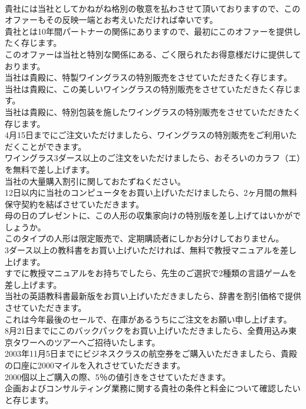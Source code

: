 \documentclass[8pt]{extreport}
\begin{document}
\begin{CJK}{UTF8}{min}
\\	貴社には当社としてかねがね格別の敬意を払わさせて頂いておりますので、このオファーもその反映一端とお考えいただければ幸いです。   
\\	貴社とは10年間パートナーの関係にありますので、最初にこのオファーを提供したく存じます。   
\\	このオファーは当社と特別な関係にある、ごく限られたお得意様だけに提供しております。   
\\	当社は貴殿に、特製ワイングラスの特別販売をさせていただきたく存じます。   
\\	当社は貴殿に、この美しいワイングラスの特別販売をさせていただきたく存じます。   
\\	当社は貴殿に、特別包装を施したワイングラスの特別販売をさせていただきたく存じます。   
\\	4月15日までにご注文いただけましたら、ワイングラスの特別販売をご利用いただくことができます。   
\\	ワイングラス3ダース以上のご注文をいただけましたら、おそろいのカラフ（エ）を無料で差し上げます。   
\\	当社の大量購入割引に関しておたずねください。   
\\	12日以内に当社のコンピュータをお買い上げいただけましたら、2ヶ月間の無料保守契約を結ばさせていただきます。   
\\	母の日のプレゼントに、この人形の収集家向けの特別版を差し上げてはいかがでしょうか。   
\\	このタイプの人形は限定販売で、定期購読者にしかお分けしておりません。   
\\	3ダース以上の教科書をお買い上げいただければ、無料で教授マニュアルを差し上げます。   
\\	すでに教授マニュアルをお持ちでしたら、先生のご選択で2種類の言語ゲームを差し上げます。   
\\	当社の英語教科書最新版をお買い上げいただきましたら、辞書を割引価格で提供させていただきます。   
\\	これは今年最後のセールで、在庫があるうちにご注文をお願い申し上げます。  
\\	8月21日までにこのバックパックをお買い上げいただきましたら、全費用込み東京タワーへのツアーへご招待いたします。  
\\	2003年11月5日までにビジネスクラスの航空券をご購入いただきましたら、貴殿の口座に2000マイルを入れさせていただきます。  
\\	2000個以上ご購入の際、5％の値引きをさせていただきます。  
\\	企画およびコンサルティング業務に関する貴社の条件と料金について確認したいと存じます。   

\end{CJK}
\end{document}
